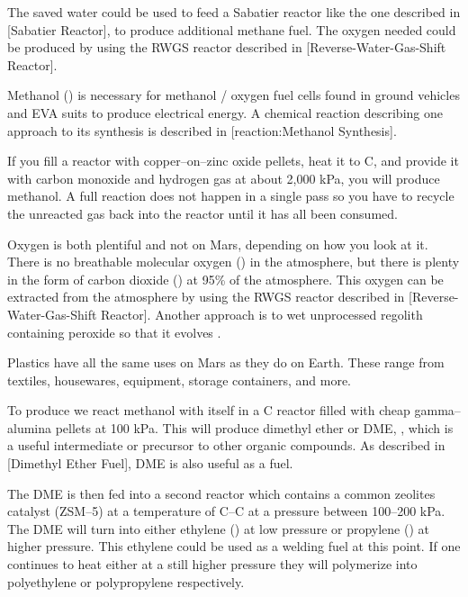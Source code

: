 The saved water could be used to feed a Sabatier reactor like the one described in [Sabatier Reactor], to produce additional methane fuel. The oxygen needed could be produced by using the RWGS reactor described in [Reverse-Water-Gas-Shift Reactor].

Methanol () is necessary for methanol / oxygen fuel cells found in ground vehicles and EVA suits to produce electrical energy. A chemical reaction describing one approach to its synthesis is described in [reaction:Methanol Synthesis].

\startformula
{}
\stopformula

If you fill a reactor with copper--on--zinc oxide pellets, heat it to C, and provide it with carbon monoxide and hydrogen gas at about 2,000 kPa, you will produce methanol. A full reaction does not happen in a single pass so you have to recycle the unreacted gas back into the reactor until it has all been consumed.

Oxygen is both plentiful and not on Mars, depending on how you look at it. There is no breathable molecular oxygen () in the atmosphere, but there is plenty in the form of carbon dioxide () at 95\% of the atmosphere. This oxygen can be extracted from the atmosphere by using the RWGS reactor described in [Reverse-Water-Gas-Shift Reactor]. Another approach is to wet unprocessed regolith containing peroxide so that it evolves .

Plastics have all the same uses on Mars as they do on Earth. These range from textiles, housewares, equipment, storage containers, and more.

To produce we react methanol with itself in a C reactor filled with cheap gamma--alumina pellets at 100 kPa. This will produce dimethyl ether or DME, , which is a useful intermediate or precursor to other organic compounds. As described in [Dimethyl Ether Fuel], DME is also useful as a fuel.

The DME is then fed into a second reactor which contains a common zeolites catalyst (ZSM--5) at a temperature of C--C at a pressure between 100--200 kPa. The DME will turn into either ethylene () at low pressure or propylene () at higher pressure. This ethylene could be used as a welding fuel at this point. If one continues to heat either at a still higher pressure they will polymerize into polyethylene or polypropylene respectively.

